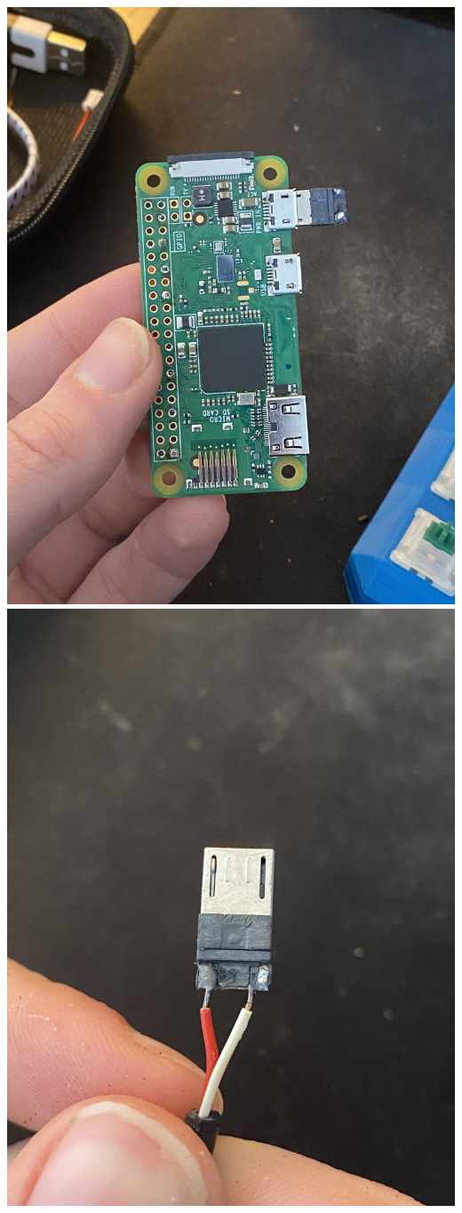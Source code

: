 \documentclass[a4paper,11pt]{article}
\begin{document}
\begin{center}
    \includegraphics[scale=0.05]{img/schematics/vizia-power-usb-conn.png}
    \includegraphics[scale=0.05]{img/schematics/vizia-power-usb.png}

\end{center}
\end{document}
